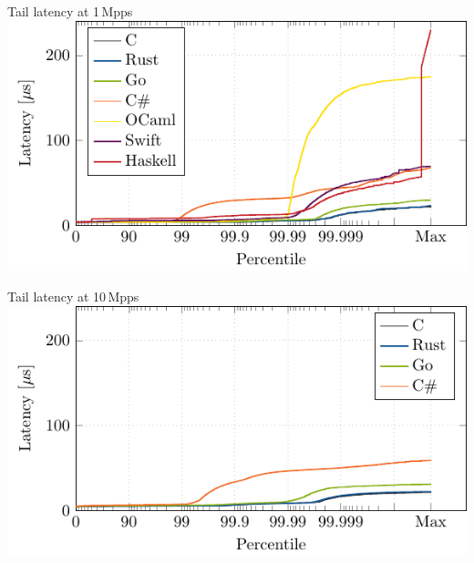 \documentclass[NET,english,aspectratio=43,notitleframe]{tumbeamer}
\begin{document}
%
%
%
%

\begin{frame}{Tail latency at 1\,Mpps}
\centering\includegraphics[scale=1.1]{figures/latency-1/latency-ccdf.pdf}
\end{frame}

\begin{frame}{Tail latency at 10\,Mpps}
\centering\includegraphics[scale=1.1]{figures/latency-10/latency-ccdf.pdf}
\end{frame}
\end{document}
